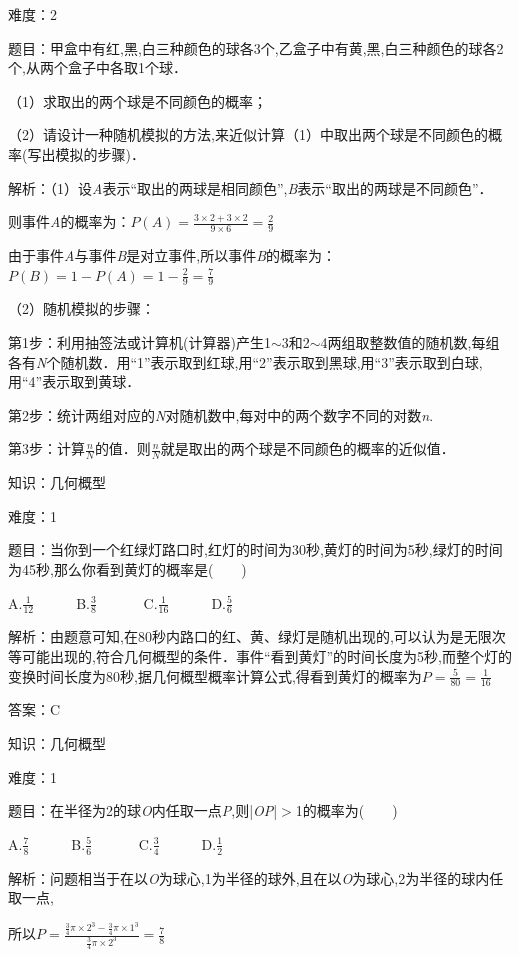 \documentclass{article} %
\begin{document}
难度：2

题目：甲盒中有红,黑,白三种颜色的球各3个,乙盒子中有黄,黑,白三种颜色的球各2个,从两个盒子中各取1个球．

（1）求取出的两个球是不同颜色的概率；

（2）请设计一种随机模拟的方法,来近似计算（1）中取出两个球是不同颜色的概率(写出模拟的步骤)．

解析：（1）设\textit{A}表示``取出的两球是相同颜色'',\textit{B}表示``取出的两球是不同颜色''．

则事件\textit{A}的概率为：$P(A)=\frac{3\times2+3\times2}{9\times6}=\frac{2}{9}$

由于事件\textit{A}与事件\textit{B}是对立事件,所以事件\textit{B}的概率为：$P(B)=1-P(A)=1-\frac{2}{9}=\frac{7}{9}$

（2）随机模拟的步骤：

第1步：利用抽签法或计算机(计算器)产生1$\sim$3和2$\sim$4两组取整数值的随机数,每组各有\textit{N}个随机数．用``1''表示取到红球,用``2''表示取到黑球,用``3''表示取到白球,用``4''表示取到黄球．

第2步：统计两组对应的\textit{N}对随机数中,每对中的两个数字不同的对数\textit{n}.

第3步：计算$\frac{n}{N}$的值．则$\frac{n}{N}$就是取出的两个球是不同颜色的概率的近似值．

知识：几何概型

难度：1

题目：当你到一个红绿灯路口时,红灯的时间为30秒,黄灯的时间为5秒,绿灯的时间为45秒,那么你看到黄灯的概率是(　　)

A.$\frac{1}{12}$　　　B.$\frac{3}{8}$　　　
C.$\frac{1}{16}$　　　D.$\frac{5}{6}$

解析：由题意可知,在80秒内路口的红、黄、绿灯是随机出现的,可以认为是无限次等可能出现的,符合几何概型的条件．事件``看到黄灯''的时间长度为5秒,而整个灯的变换时间长度为80秒,据几何概型概率计算公式,得看到黄灯的概率为$P=\frac{5}{80}=\frac{1}{16}$

答案：C

知识：几何概型

难度：1

题目：在半径为2的球\textit{O}内任取一点\textit{P},则|\textit{OP}|$\mathrm{>}$1的概率为(　　)

A.$\frac{7}{8}$　　　B.$\frac{5}{6}$　　　
C.$\frac{3}{4}$　　　D.$\frac{1}{2}$

解析：问题相当于在以\textit{O}为球心,1为半径的球外,且在以\textit{O}为球心,2为半径的球内任取一点,

所以$P=\frac{\frac{3}{4}\pi\times2^3-\frac{3}{4}\pi\times1^3}{\frac{3}{4}\pi\times2^3}=\frac{7}{8}$
\end{document}
